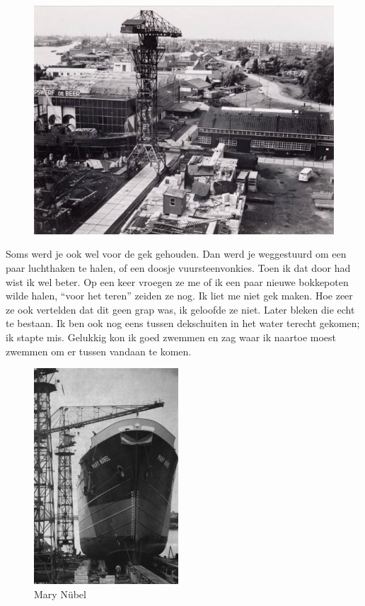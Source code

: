 \documentclass[12pt,twoside, openright]{memoir}
\begin{document}
\begin{figure}
\centering
\includegraphics[width=\textwidth]{img/90deBeer}
\end{figure}

Soms werd je ook wel voor de gek gehouden. Dan werd je weggestuurd om een paar luchthaken te halen, of een doosje vuursteenvonkies. Toen ik dat door had wist ik wel beter. Op een keer vroegen ze me of ik een paar nieuwe bokkepoten wilde halen, ``voor het teren'' zeiden ze nog. Ik liet me niet gek maken. Hoe zeer ze ook vertelden dat dit geen grap was, ik geloofde ze niet. Later bleken die echt te bestaan. Ik ben ook nog eens tussen dekschuiten in het water terecht gekomen; ik stapte mis. Gelukkig kon ik goed zwemmen en zag waar ik naartoe moest zwemmen om er tussen vandaan te komen. 

\begin{figure}
\begin{center}
\includegraphics[width=0.48\textwidth]{img/ch15/schuttevaer12}
\caption*{\footnotesize Mary Nübel}
\end{center}
\end{figure}
\end{document}
